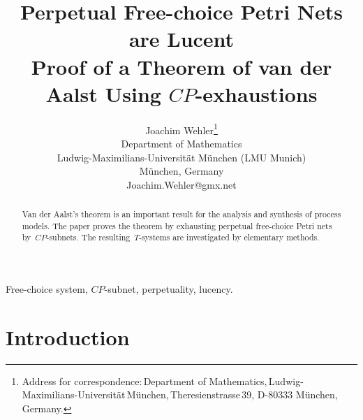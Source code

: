 \documentclass{fundam}
\begin{document}
\setcounter{page}{363}

  \finalVersionForARXIV


\title{Perpetual Free-choice Petri Nets are Lucent \\ Proof of a Theorem of van der Aalst Using $CP$-exhaustions}

\author{Joachim Wehler\thanks{Address  for correspondence:$\,$Department of
                          Mathematics,$\,$Ludwig-Maximilians-Universit{\"a}t$\,$M{\"u}nchen,$\,$\mbox{Theresienstrasse$\,$39}, D-80333 M\"unchen, Germany.\newline \newline
          }
 \\
Department of Mathematics \\
Ludwig-Maximilians-Universit{\"a}t M{\"u}nchen (LMU Munich)\\
M\"unchen, Germany\\
Joachim.Wehler@gmx.net}

\maketitle


\setcounter{footnote}{0}

\begin{abstract}
Van der Aalst's theorem is an important result for the \mbox{analysis} and synthesis of process models. The paper proves the theorem by exhausting perpetual free-choice Petri nets \mbox{by $CP$-subnets}. The \mbox{resulting $T$-systems} are investigated by elementary methods.
\end{abstract}

\begin{keywords}
Free-choice system, $CP$-subnet, perpetuality, lucency.
\end{keywords}




\section{Introduction} \label{sect_introduction}
\end{document}
